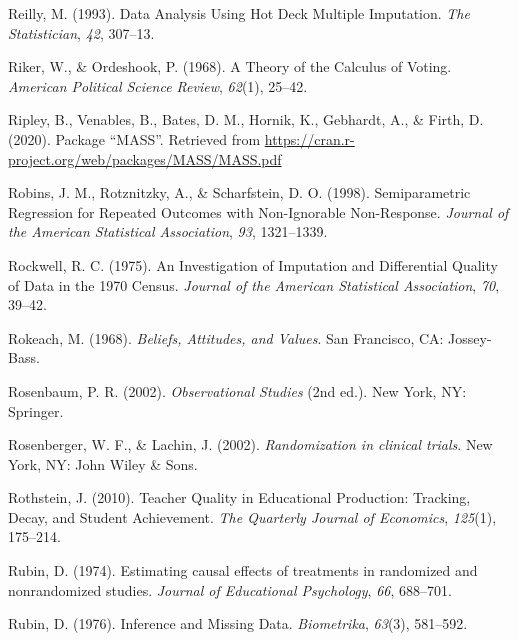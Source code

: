 \documentclass[12pt,econ]{sources/authesis}
\begin{document}
\leavevmode\hypertarget{ref-reilly_1993_data}{}%
Reilly, M. (1993). Data Analysis Using Hot Deck Multiple Imputation. \emph{The Statistician}, \emph{42}, 307--13.

\leavevmode\hypertarget{ref-riker_theory_1968}{}%
Riker, W., \& Ordeshook, P. (1968). A Theory of the Calculus of Voting. \emph{American Political Science Review}, \emph{62}(1), 25--42.

\leavevmode\hypertarget{ref-ripley_2020_package}{}%
Ripley, B., Venables, B., Bates, D. M., Hornik, K., Gebhardt, A., \& Firth, D. (2020). Package ``MASS''. Retrieved from \url{https://cran.r-project.org/web/packages/MASS/MASS.pdf}

\leavevmode\hypertarget{ref-robins_1998_semiparametric}{}%
Robins, J. M., Rotznitzky, A., \& Scharfstein, D. O. (1998). Semiparametric Regression for Repeated Outcomes with Non-Ignorable Non-Response. \emph{Journal of the American Statistical Association}, \emph{93}, 1321--1339.

\leavevmode\hypertarget{ref-rockwell_1975_investigation}{}%
Rockwell, R. C. (1975). An Investigation of Imputation and Differential Quality of Data in the 1970 Census. \emph{Journal of the American Statistical Association}, \emph{70}, 39--42.

\leavevmode\hypertarget{ref-rokeach_1968_beliefs}{}%
Rokeach, M. (1968). \emph{Beliefs, Attitudes, and Values}. San Francisco, CA: Jossey-Bass.

\leavevmode\hypertarget{ref-rosenbaum_2002_observational}{}%
Rosenbaum, P. R. (2002). \emph{Observational Studies} (2nd ed.). New York, NY: Springer.

\leavevmode\hypertarget{ref-rosenberger_2002_randomization}{}%
Rosenberger, W. F., \& Lachin, J. (2002). \emph{Randomization in clinical trials}. New York, NY: John Wiley \& Sons.

\leavevmode\hypertarget{ref-rothstein_2010_teacher}{}%
Rothstein, J. (2010). Teacher Quality in Educational Production: Tracking, Decay, and Student Achievement. \emph{The Quarterly Journal of Economics}, \emph{125}(1), 175--214.

\leavevmode\hypertarget{ref-rubin_1974_estimating}{}%
Rubin, D. (1974). Estimating causal effects of treatments in randomized and nonrandomized studies. \emph{Journal of Educational Psychology}, \emph{66}, 688--701.

\leavevmode\hypertarget{ref-rubin_1976_inference}{}%
Rubin, D. (1976). Inference and Missing Data. \emph{Biometrika}, \emph{63}(3), 581--592.
\end{document}
